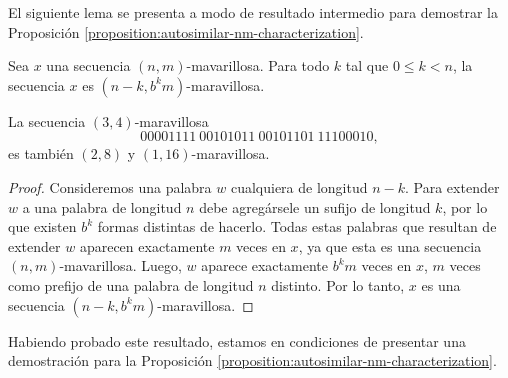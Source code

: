 El siguiente lema se presenta a modo de resultado intermedio para
demostrar la Proposición \ref{proposition:autosimilar-nm-characterization}.

\begin{lemma} \label{lemma:marvellous-for-smaller-n}
	Sea $x$ una secuencia $(n,m)$-mavarillosa.
	Para todo $k$ tal que $0 \leq k < n$, la secuencia $x$ es
	$(n - k, b^{k}m)$-maravillosa.
\end{lemma}

\begin{example}
	La secuencia $(3,4)$-maravillosa \[ 00001111\ 00101011\ 00101101\ 11100010, \]
	es también $(2,8)$ y $(1,16)$-maravillosa.
\end{example}

\begin{proof}
	Consideremos una palabra $w$ cualquiera de longitud $n - k$.
	Para extender $w$ a una palabra de longitud $n$ debe agregársele un sufijo de
	longitud $k$, por lo que existen $b^{k}$ formas distintas de hacerlo.
	Todas estas palabras que resultan de extender $w$ aparecen exactamente $m$
	veces en $x$, ya que esta es una secuencia $(n,m)$-mavarillosa.
	Luego, $w$ aparece exactamente $b^{k}m$ veces en $x$, $m$ veces como prefijo de
	una palabra de longitud $n$ distinto.
	Por lo tanto, $x$ es una secuencia $(n - k, b^{k}m)$-maravillosa.
\end{proof}

Habiendo probado este resultado, estamos en condiciones de presentar una
demostración para la Proposición \ref{proposition:autosimilar-nm-characterization}.

